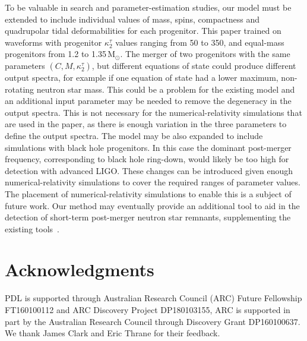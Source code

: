 \documentclass[../Thesis.tex]{subfiles}
\begin{document}
        To be valuable in search and parameter-estimation studies, our model must be extended to include individual values of mass, spins, compactness and quadrupolar tidal deformabilities for each progenitor. This paper trained on waveforms with progenitor $\kappa^\tau_2$ values ranging from 50 to 350, and equal-mass progenitors from 1.2 to 1.35\,M$_\odot$. The merger of two progenitors with the same parameters $(C,M,\kappa_2^\tau)$, but different equations of state could produce different output spectra, for example if one equation of state had a lower maximum, non-rotating neutron star mass. This could be a problem for the existing model and an additional input parameter may be needed to remove the degeneracy in the output spectra. This is not necessary for the numerical-relativity simulations that are used in the paper, as there is enough variation in the three parameters to define the output spectra. The model may be also expanded to include simulations with black hole progenitors. In this case the dominant post-merger frequency, corresponding to black hole ring-down, would likely be too high for detection with advanced LIGO. These changes can be introduced given enough numerical-relativity simulations to cover the required ranges of parameter values. The placement of numerical-relativity simulations to enable this is a subject of future work. Our method may eventually provide an additional tool to aid in the detection of short-term post-merger neutron star remnants, supplementing the existing tools~\cite{Klimenko2016,Chatziioannou2017}.
\section*{Acknowledgments}
        PDL is supported through Australian Research Council (ARC) Future Fellowship FT160100112 and ARC Discovery Project DP180103155, ARC is supported in part by the Australian Research Council through Discovery Grant DP160100637. We thank James Clark and Eric Thrane for their feedback.
\end{document}
